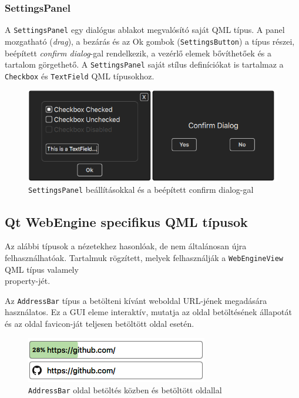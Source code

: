 \documentclass[12pt]{report}
\begin{document}
\subsubsection{SettingsPanel}
A \texttt{SettingsPanel} egy dialógus ablakot megvalósító saját QML típus. A panel
mozgatható (\textit{drag}), a bezárás és az Ok gombok (\texttt{SettingsButton}) a típus
részei, beépített \textit{confirm dialog}-gal rendelkezik, a vezérlő elemek bővíthetőek
és a tartalom görgethető. A \texttt{SettingsPanel} saját stílus definíciókat is tartalmaz
a \texttt{Checkbox} és \texttt{TextField} QML típusokhoz.

\begin{figure}[H]
    \centering
    \includegraphics[scale=0.7]{SettingsPanel}
    \caption{
        \label{fig:settings-panel}
        \texttt{SettingsPanel} beállításokkal és a beépített confirm dialog-gal
    }
\end{figure}

\subsection{Qt WebEngine specifikus QML típusok}
Az alábbi típusok a nézetekhez hasonlóak, de nem általánosan újra felhasználhatóak.
Tartalmuk rögzített, melyek felhasználják a \texttt{WebEngineView} QML típus valamely \\
property-jét.

Az \texttt{AddressBar} típus a betölteni kívánt weboldal URL-jének megadására használatos.
Ez a GUI eleme interaktív, mutatja az oldal betöltésének állapotát és az oldal favicon-ját
teljesen betöltött oldal esetén.
\begin{figure}[H]
    \centering
    \includegraphics[scale=0.8]{AddressBar}
    \caption{
        \label{fig:address-bar}
        \texttt{AddressBar} oldal betöltés közben és betöltött oldallal
    }
\end{figure}
\end{document}
